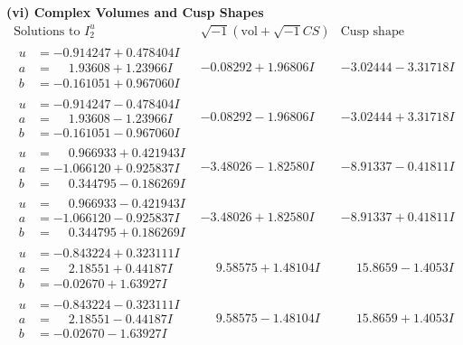 \documentclass[1p]{elsarticle_modified}
\theoremstyle{definition}
\newcommand{\I}{\sqrt{-1}}
\begin{document}
\newpage\flushleft \textbf{(vi) Complex Volumes and Cusp Shapes}
$$\begin{array}{c|c|c}  
\text{Solutions to }I^u_{2}& \I (\text{vol} + \sqrt{-1}CS) & \text{Cusp shape}\\
 \hline 
\begin{aligned}
u &= -0.914247 + 0.478404 I \\
a &= \phantom{-}1.93608 + 1.23966 I \\
b &= -0.161051 + 0.967060 I\end{aligned}
 & -0.08292 + 1.96806 I & -3.02444 - 3.31718 I \\ \hline\begin{aligned}
u &= -0.914247 - 0.478404 I \\
a &= \phantom{-}1.93608 - 1.23966 I \\
b &= -0.161051 - 0.967060 I\end{aligned}
 & -0.08292 - 1.96806 I & -3.02444 + 3.31718 I \\ \hline\begin{aligned}
u &= \phantom{-}0.966933 + 0.421943 I \\
a &= -1.066120 + 0.925837 I \\
b &= \phantom{-}0.344795 - 0.186269 I\end{aligned}
 & -3.48026 - 1.82580 I & -8.91337 - 0.41811 I \\ \hline\begin{aligned}
u &= \phantom{-}0.966933 - 0.421943 I \\
a &= -1.066120 - 0.925837 I \\
b &= \phantom{-}0.344795 + 0.186269 I\end{aligned}
 & -3.48026 + 1.82580 I & -8.91337 + 0.41811 I \\ \hline\begin{aligned}
u &= -0.843224 + 0.323111 I \\
a &= \phantom{-}2.18551 + 0.44187 I \\
b &= -0.02670 + 1.63927 I\end{aligned}
 & \phantom{-}9.58575 + 1.48104 I & \phantom{-}15.8659 - 1.4053 I \\ \hline\begin{aligned}
u &= -0.843224 - 0.323111 I \\
a &= \phantom{-}2.18551 - 0.44187 I \\
b &= -0.02670 - 1.63927 I\end{aligned}
 & \phantom{-}9.58575 - 1.48104 I & \phantom{-}15.8659 + 1.4053 I \\ \hline\begin{aligned}

\end{aligned}
\end{array}$$
\end{document}
